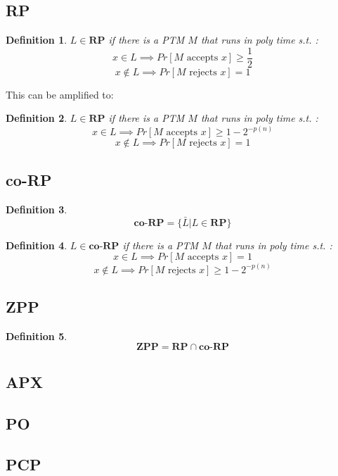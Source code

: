 \documentclass[]{article}
\theoremstyle{break}
\theoremstyle{break}
\newtheorem{definition}{Definition}[section]
\begin{document}
\subsection{RP}
\label{sec:rp}
\begin{definition}
	$L\in \textbf{RP}$ if there is a PTM $M$ that runs in poly time s.t. :
	$$x \in L \implies 	Pr[M \text{ accepts } x]\geq \frac{1}{2}$$
	$$x \notin L \implies 	Pr[M \text{ rejects } x] = 1$$
\end{definition}
This can be amplified to:
\begin{definition}
	$L\in \textbf{RP}$ if there is a PTM $M$ that runs in poly time s.t. :
	$$x \in L \implies 	Pr[M \text{ accepts } x]\geq 1 - 2^{-p(n)}$$
	$$x \notin L \implies 	Pr[M \text{ rejects } x] = 1$$
\end{definition}
\subsection{co-RP}
\label{sec:co-rp}
\begin{definition}
	$$\textbf{co-RP} = \{\bar{L}| L\in \hyperref[sec:rp]{\textbf{RP}} \}$$
\end{definition}
\begin{definition}
	$L\in \textbf{co-RP}$ if there is a PTM $M$ that runs in poly time s.t. :
	$$x \in L \implies 	Pr[M \text{ accepts } x] = 1$$
	$$x \notin L \implies 	Pr[M \text{ rejects } x] \geq 1 - 2^{-p(n)}$$
\end{definition}
\subsection{ZPP}
\label{sec:zpp}
\begin{definition}
	$$\textbf{ZPP} = \hyperref[sec:rp]{\textbf{RP}} \cap \hyperref[sec:co-rp]{\textbf{co-RP}}$$
\end{definition}

\subsection{APX}

\subsection{PO}

\subsection{PCP}
\end{document}
